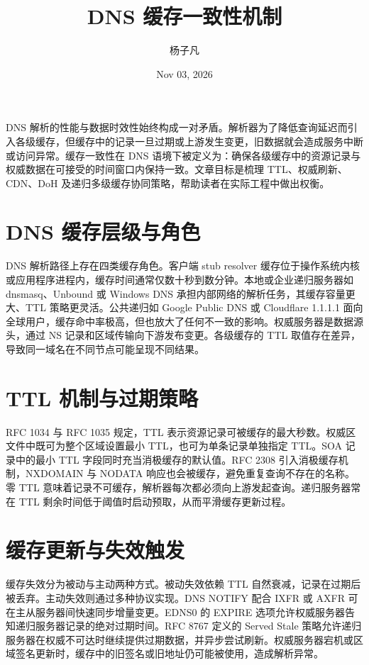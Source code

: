 \title{DNS 缓存一致性机制}
\author{杨子凡}
\date{Nov 03, 2026}
\maketitle
DNS 解析的性能与数据时效性始终构成一对矛盾。解析器为了降低查询延迟而引入各级缓存，但缓存中的记录一旦过期或上游发生变更，旧数据就会造成服务中断或访问异常。缓存一致性在 DNS 语境下被定义为：确保各级缓存中的资源记录与权威数据在可接受的时间窗口内保持一致。文章目标是梳理 TTL、权威刷新、CDN、DoH 及递归多级缓存协同策略，帮助读者在实际工程中做出权衡。\par
\chapter{DNS 缓存层级与角色}
DNS 解析路径上存在四类缓存角色。客户端 stub resolver 缓存位于操作系统内核或应用程序进程内，缓存时间通常仅数十秒到数分钟。本地或企业递归服务器如 dnsmasq、Unbound 或 Windows DNS 承担内部网络的解析任务，其缓存容量更大、TTL 策略更灵活。公共递归如 Google Public DNS 或 Cloudflare 1.1.1.1 面向全球用户，缓存命中率极高，但也放大了任何不一致的影响。权威服务器是数据源头，通过 NS 记录和区域传输向下游发布变更。各级缓存的 TTL 取值存在差异，导致同一域名在不同节点可能呈现不同结果。\par
\chapter{TTL 机制与过期策略}
RFC 1034 与 RFC 1035 规定，TTL 表示资源记录可被缓存的最大秒数。权威区文件中既可为整个区域设置最小 TTL，也可为单条记录单独指定 TTL。SOA 记录中的最小 TTL 字段同时充当消极缓存的默认值。RFC 2308 引入消极缓存机制，NXDOMAIN 与 NODATA 响应也会被缓存，避免重复查询不存在的名称。零 TTL 意味着记录不可缓存，解析器每次都必须向上游发起查询。递归服务器常在 TTL 剩余时间低于阈值时启动预取，从而平滑缓存更新过程。\par
\chapter{缓存更新与失效触发}
缓存失效分为被动与主动两种方式。被动失效依赖 TTL 自然衰减，记录在过期后被丢弃。主动失效则通过多种协议实现。DNS NOTIFY 配合 IXFR 或 AXFR 可在主从服务器间快速同步增量变更。EDNS0 的 EXPIRE 选项允许权威服务器告知递归服务器记录的绝对过期时间。RFC 8767 定义的 Served Stale 策略允许递归服务器在权威不可达时继续提供过期数据，并异步尝试刷新。权威服务器宕机或区域签名更新时，缓存中的旧签名或旧地址仍可能被使用，造成解析异常。\par

